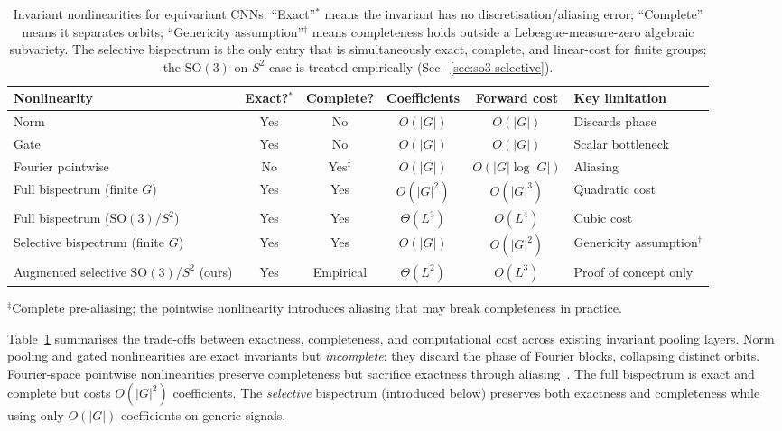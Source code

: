 \documentclass{article}
\theoremstyle{definition}
\theoremstyle{remark}
\newcommand{\SO}{\mathrm{SO}}
\theoremstyle{definition}
\begin{document}
\begin{table}[t]
  \caption{Invariant nonlinearities for equivariant CNNs. ``Exact''$^*$
    means the invariant has no discretisation/aliasing error; ``Complete''
    means it separates orbits; ``Genericity assumption''$^\dagger$ means
    completeness holds outside a Lebesgue-measure-zero algebraic
    subvariety. The selective bispectrum is the only entry that is
    simultaneously exact, complete, and linear-cost for finite groups;
    the $\SO(3)$-on-$S^2$ case is treated empirically
    (Sec.~\ref{sec:so3-selective}).}
  \label{tab:nonlinearity-comparison}
  \centering
  \small
  \setlength{\tabcolsep}{4pt}
  \begin{tabular}{lccccl}
    \toprule
    Nonlinearity & Exact?$^*$ & Complete? & Coefficients & Forward cost & Key limitation \\
    \midrule
    Norm              & Yes & No              & $O(|G|)$   & $O(|G|)$          & Discards phase \\
    Gate              & Yes & No              & $O(|G|)$   & $O(|G|)$          & Scalar bottleneck \\
    Fourier pointwise & No  & Yes$^\ddagger$  & $O(|G|)$   & $O(|G| \log |G|)$ & Aliasing \\
    Full bispectrum (finite $G$)      & Yes & Yes & $O(|G|^2)$   & $O(|G|^3)$ & Quadratic cost \\
    Full bispectrum ($\SO(3)$/$S^2$)  & Yes & Yes & $\Theta(L^3)$ & $O(L^4)$  & Cubic cost \\
    \midrule
    Selective bispectrum (finite $G$) & Yes & Yes       & $O(|G|)$      & $O(|G|^2)$ & Genericity assumption$^\dagger$ \\
    Augmented selective $\SO(3)$/$S^2$ (ours) & Yes & Empirical & $\Theta(L^2)$ & $O(L^3)$   & Proof of concept only \\
    \bottomrule
  \end{tabular}

  \vspace{0.3em}
  {\small $^\ddagger$Complete pre-aliasing; the pointwise nonlinearity introduces aliasing that may break completeness in practice.}
\end{table}

Table~\ref{tab:nonlinearity-comparison} summarises the trade-offs between
exactness, completeness, and computational cost across existing invariant
pooling layers. Norm pooling and gated nonlinearities are exact
invariants but \emph{incomplete}: they discard the phase of Fourier
blocks, collapsing distinct orbits. Fourier-space pointwise
nonlinearities preserve completeness but sacrifice exactness through
\mbox{aliasing~\citep{weiler2019general}}. The full bispectrum is exact and
complete but costs $O(|G|^2)$ coefficients. The \emph{selective}
bispectrum (introduced below) preserves both exactness and completeness
while using only $O(|G|)$ coefficients on generic signals.
\end{document}
